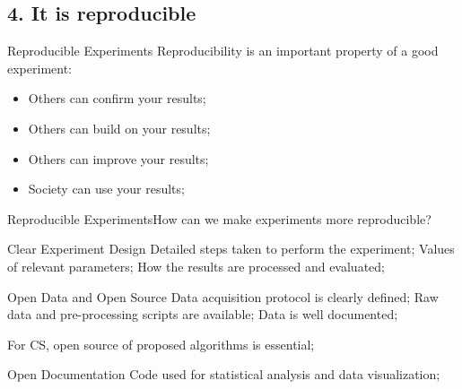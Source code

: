 \subsection{4. It is reproducible}
\begin{frame}{Reproducible Experiments}
  Reproducibility is an important property of a good experiment:
  \bigskip

  \begin{itemize}
    \item Others can confirm your results;
      \medskip
    \item Others can build on your results;
      \medskip
    \item Others can improve your results;
      \medskip
    \item Society can use your results;
  \end{itemize}
\end{frame}

\begin{frame}{Reproducible Experiments}{How can we make experiments more reproducible?}
  \begin{exampleblock}{Clear Experiment Design}
    Detailed steps taken to perform the experiment; Values of relevant parameters; How the results are processed and evaluated;
  \end{exampleblock}
  \begin{exampleblock}{Open Data and Open Source}
    Data acquisition protocol is clearly defined; Raw data and pre-processing scripts are available; Data is well documented;\bigskip

    For CS, open source of proposed algorithms is essential;
  \end{exampleblock}
  \begin{exampleblock}{Open Documentation}
    Code used for statistical analysis and data visualization;
  \end{exampleblock}
\end{frame}


%
%
%


